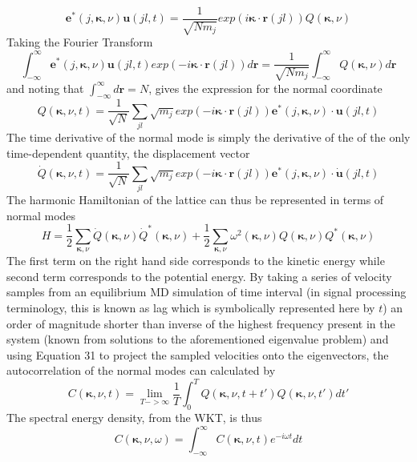 \documentclass[aps,prb,preprint,preprintnumbers,amsmath,amssymb,floatfix,superscriptaddress]{revtex4}
\begin{document}
\begin{equation}
\pmb{e}^*(j,\pmb{\kappa},\nu)\pmb{u}(jl,t)=\frac{1}{\sqrt{Nm_j}}exp(i\pmb{\kappa}\cdot\pmb{r}(jl))Q(\pmb{\kappa},\nu)
\end{equation}
Taking the Fourier Transform
\begin{equation}
\int_{-\infty}^{\infty}\pmb{e}^*(j,\pmb{\kappa},\nu)\pmb{u}(jl,t)exp(-i\pmb{\kappa}\cdot\pmb{r}(jl))d\pmb{r}=\frac{1}{\sqrt{Nm_j}}\int_{-\infty}^{\infty}Q(\pmb{\kappa},\nu)d\pmb{r}
\end{equation}
and noting that $\int_{-\infty}^{\infty}d\pmb{r}=N$, gives the expression for the normal coordinate
\begin{equation}
Q(\pmb{\kappa},\nu,t)=\frac{1}{\sqrt{N}}\sum_{jl}\sqrt{m_j}exp(-i\pmb{\kappa}\cdot\pmb{r}(jl))\pmb{e}^*(j,\pmb{\kappa},\nu)\cdot\pmb{u}(jl,t)
\end{equation}
The time derivative of the normal mode is simply the derivative of the of the only time-dependent quantity, the displacement vector
\begin{equation}
\dot{Q}(\pmb{\kappa},\nu,t)=\frac{1}{\sqrt{N}}\sum_{jl}\sqrt{m_j}exp(-i\pmb{\kappa}\cdot\pmb{r}(jl))\pmb{e}^*(j,\pmb{\kappa},\nu)\cdot\dot{\pmb{u}}(jl,t)
\end{equation}
The harmonic Hamiltonian of the lattice can thus be represented in terms of normal modes
\begin{equation}
H=\frac{1}{2}\sum_{\pmb{\kappa},\nu}\dot{Q}(\pmb{\kappa},\nu)\dot{Q}^*(\pmb{\kappa},\nu)+\frac{1}{2}\sum_{\pmb{\kappa},\nu}\omega^2(\pmb{\kappa},\nu)Q(\pmb{\kappa},\nu)Q^*(\pmb{\kappa},\nu)
\end{equation}
The first term on the right hand side corresponds to the kinetic energy while second term corresponds to the potential energy. By taking a series of velocity samples from an equilibrium MD simulation of time interval (in signal processing terminology, this is known as lag which is symbolically represented here by $t$) an order of magnitude shorter than inverse of the highest frequency present in the system (known from solutions to the aforementioned eigenvalue problem) and using Equation 31 to project the sampled velocities onto the eigenvectors, the autocorrelation of the normal modes can calculated by
\begin{equation}
C(\pmb{\kappa},\nu,t)=\lim_{T->\infty}\frac{1}{T}\int_{0}^{T}Q(\pmb{\kappa},\nu,t+t')Q(\pmb{\kappa},\nu,t')dt'
\end{equation}
The spectral energy density, from the WKT, is thus
\begin{equation}
C(\pmb{\kappa},\nu,\omega)=\int_{-\infty}^{\infty}C(\pmb{\kappa},\nu,t)e^{-i\omega t}dt
\end{equation}
\end{document}
